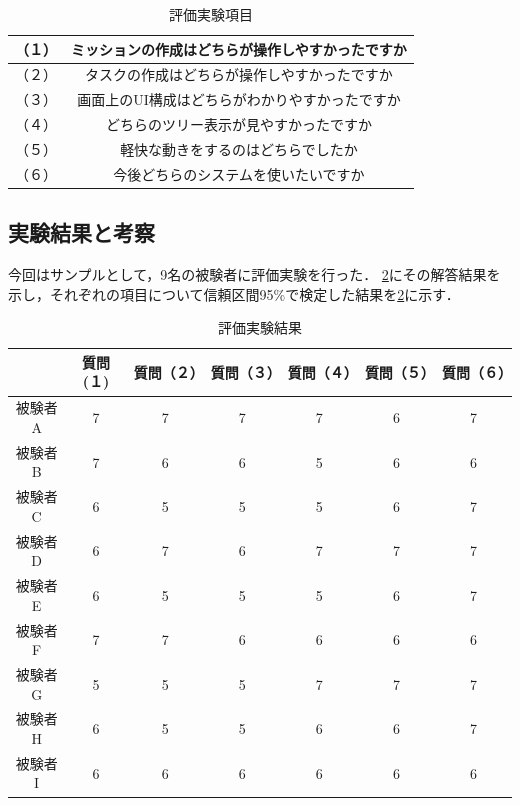 \begin{table}[t]
 \caption{評価実験項目}
 \begin{center}
	 \begin{tabular}{ | c | c | } \hline
		（１） & ミッションの作成はどちらが操作しやすかったですか \\ \hline
 		（２） & タスクの作成はどちらが操作しやすかったですか \\ \hline
 		（３） & 画面上のUI構成はどちらがわかりやすかったですか \\ \hline
 		（４） & どちらのツリー表示が見やすかったですか \\ \hline
 		（５） & 軽快な動きをするのはどちらでしたか \\ \hline
 		（６） & 今後どちらのシステムを使いたいですか \\ \hline
	 \end{tabular}
	 \label{table:experiment_question}
 \end{center}
\end{table}

\subsection{実験結果と考察}
今回はサンプルとして，9名の被験者に評価実験を行った．
\ref{table:experiment_result}にその解答結果を示し，それぞれの項目について信頼区間95\%で検定した結果を\ref{table:experiment_result}に示す．

\begin{table}[t]
 \caption{評価実験結果}
 \begin{center}
	 \begin{tabular}{ | c || c | c | c | c | c | c | } \hline
		  & 質問(１) & 質問（２） & 質問（３） & 質問（４） & 質問（５） & 質問（６） \\ \hline \hline
			被験者A & 7 & 7 & 7 & 7 & 6 & 7 \\ \hline
			被験者B & 7 & 6 & 6 & 5 & 6 & 6 \\ \hline
			被験者C & 6 & 5 & 5 & 5 & 6 & 7 \\ \hline
			被験者D & 6 & 7 & 6 & 7 & 7 & 7 \\ \hline
			被験者E & 6 & 5 & 5 & 5 & 6 & 7 \\ \hline
			被験者F & 7 & 7 & 6 & 6 & 6 & 6 \\ \hline
			被験者G & 5 & 5 & 5 & 7 & 7 & 7 \\ \hline
			被験者H & 6 & 5 & 5 & 6 & 6 & 7 \\ \hline
			被験者I & 6 & 6 & 6 & 6 & 6 & 6 \\ \hline
	 \end{tabular}
	 \label{table:experiment_result}
 \end{center}
\end{table}


